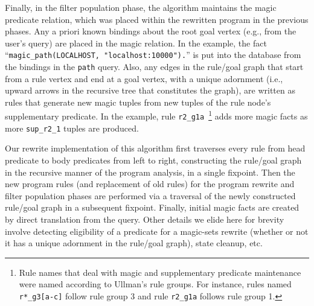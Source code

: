 \documentclass{sigmod08}
\newcommand{\ol}[1]{\texttt{\small #1}\xspace}
\begin{document}
Finally, in the filter population phase, the algorithm maintains the
magic predicate relation, which was placed within the rewritten program
in the previous phases.  Any a priori known bindings about the root goal vertex
(e.g., from the user's query) are 
placed in the magic relation. In the example, the fact ``\ol{magic\_path(LOCALHOST, "localhost:10000").}'' is put into the
database from the bindings in the \ol{path} query.  Also, any edges in
the rule/goal graph that start from a rule vertex and end at a goal vertex, with a
unique adornment (i.e., upward arrows in the recursive tree that constitutes the graph), are written as
rules that generate new magic tuples from new tuples of the rule
node's supplementary predicate. In the example, rule \ol{r2\_g1a}~\footnote{Rule names that
deal with magic and supplementary predicate maintenance were named according
to Ullman's rule groups. For instance, rules named \ol{r*\_g3[a-c]} follow rule group 3
and rule \ol{r2\_g1a} follows rule group 1.}  adds
more magic facts as more \ol{sup\_r2\_1} tuples are produced.

Our rewrite implementation of this algorithm first traverses every rule
from head predicate to body predicates from left to right, constructing
the rule/goal graph in the recursive manner of the program analysis, in
a single fixpoint.  Then the new program rules (and replacement of old
rules) for the program rewrite and filter population phases are
performed via a traversal of the newly constructed rule/goal graph in a
subsequent fixpoint. Finally, initial magic facts are created by direct
translation from the query.  Other details we elide here for brevity
involve detecting eligibility of a predicate for a magic-sets rewrite
(whether or not it has a unique adornment in the rule/goal graph), state
cleanup, etc. 
\end{document}
